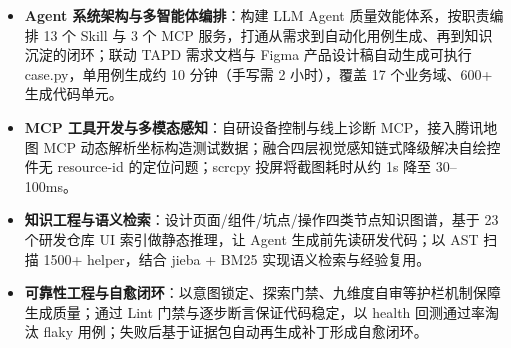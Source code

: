 \documentclass[10pt]{article}
\begin{document}
    \begin{itemize}
        \item \textbf{Agent 系统架构与多智能体编排}：构建 LLM Agent 质量效能体系，按职责编排 13 个 Skill 与 3 个 MCP 服务，打通从需求到自动化用例生成、再到知识沉淀的闭环；联动 TAPD 需求文档与 Figma 产品设计稿自动生成可执行 case.py，单用例生成约 10 分钟（手写需 2 小时），覆盖 17 个业务域、600+ 生成代码单元。
        \item \textbf{MCP 工具开发与多模态感知}：自研设备控制与线上诊断 MCP，接入腾讯地图 MCP 动态解析坐标构造测试数据；融合四层视觉感知链式降级解决自绘控件无 resource-id 的定位问题；scrcpy 投屏将截图耗时从约 1s 降至 30--100ms。
        \item \textbf{知识工程与语义检索}：设计页面/组件/坑点/操作四类节点知识图谱，基于 23 个研发仓库 UI 索引做静态推理，让 Agent 生成前先读研发代码；以 AST 扫描 1500+ helper，结合 jieba + BM25 实现语义检索与经验复用。
        \item \textbf{可靠性工程与自愈闭环}：以意图锁定、探索门禁、九维度自审等护栏机制保障生成质量；通过 Lint 门禁与逐步断言保证代码稳定，以 health 回测通过率淘汰 flaky 用例；失败后基于证据包自动再生成补丁形成自愈闭环。
    \end{itemize}
\end{document}
